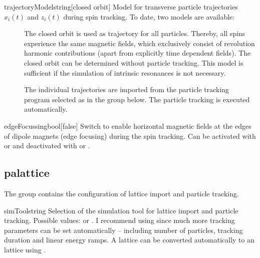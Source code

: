 \documentclass[a4paper]{scrartcl}
\begin{document}
\begin{configdoc}{trajectoryModel}{string}{}[closed orbit]
  Model for transverse particle trajectories $x_i(t)$ and
  $z_i(t)$ during spin tracking. To date, two models are available:
  \begin{description}
  \item[] The closed orbit is used as trajectory for all
    particles. Thereby, all spins experience the same magnetic fields, which exclusively
    consist of revolution harmonic contributions (apart from explicitly time dependent
    fields). The closed orbit can be determined without particle tracking. This model is
    sufficient if the simulation of intrinsic resonances is not necessary.
  \item[] The individual trajectories are imported from the particle
    tracking program selected as  in the group
     below. The particle tracking is executed automatically.
  \end{description}
\end{configdoc}

\begin{configdoc}{edgeFocussing}{bool}{}[false]
  Switch to enable horizontal magnetic fields at the edges of dipole magnets (edge
  focusing) during the spin tracking. Can be activated with  or
   and deactivated with  or . 
\end{configdoc}




\subsection{palattice}
The group  contains the configuration of lattice import and
particle tracking.\\[2mm]

\begin{configdoc}{simTool}{string}{}
  Selection of the simulation tool for lattice import and particle tracking. Possible values:
   or . I recommend using \ele since much more tracking
  parameters can be set automatically -- including number of particles, tracking duration
  and linear energy ramps. A \madx lattice can be converted automatically to an \ele
  lattice using \pal.
\end{configdoc}
\end{document}

